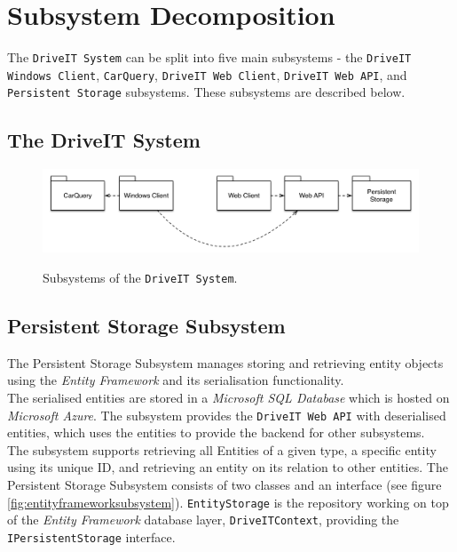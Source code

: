 \section{Subsystem Decomposition}
The \texttt{DriveIT System} can be split into five main subsystems - the \texttt{DriveIT Windows Client}, \texttt{CarQuery}, \texttt{DriveIT Web Client}, \texttt{DriveIT Web API}, and \texttt{Persistent Storage} subsystems. 
These subsystems are described below. 

\subsection{The DriveIT System}
\begin{figure}[H]
	\centering
	\includegraphics[width=\textwidth]{Figures/DriveITSubsystemDecomposition}\\
	\caption{Subsystems of the \texttt{DriveIT System}.}
\end{figure}

\subsection{Persistent Storage Subsystem} 
The Persistent Storage Subsystem manages storing and retrieving entity objects using the \textit{Entity Framework} and its serialisation functionality.\\
The serialised entities are stored in a \textit{Microsoft SQL Database} which is hosted on \textit{Microsoft Azure}. The subsystem provides the \texttt{DriveIT Web API} with deserialised entities, which uses the entities to provide the backend for other subsystems.\\
The subsystem supports retrieving all Entities of a given type, a specific entity using its unique ID, and retrieving an entity on its relation to other entities.
The Persistent Storage Subsystem consists of two classes and an interface (see figure \ref{fig:entityframeworksubsystem}). \texttt{EntityStorage} is the repository working on top of the \textit{Entity Framework} database layer, \texttt{DriveITContext}, providing the \texttt{IPersistentStorage} interface.

